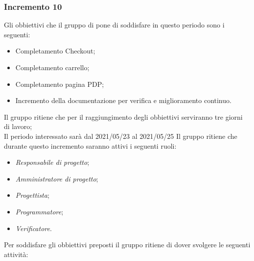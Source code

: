 \subsubsection{Incremento 10}
Gli obbiettivi che il gruppo di pone di soddisfare in questo periodo sono i seguenti:
\begin{itemize}
    \item Completamento Checkout;
    \item Completamento carrello;
    \item Completamento pagina PDP;
    \item Incremento della documentazione per verifica e miglioramento continuo.
\end{itemize}
Il gruppo ritiene che per il raggiungimento degli obbiettivi serviranno tre giorni di lavoro;\\
Il periodo interessato sarà dal 2021/05/23 al 2021/05/25
Il gruppo ritiene che durante questo incremento saranno attivi i seguenti ruoli:
\begin{itemize}
    \item \textit{Responsabile di progetto};
    \item \textit{Amministratore di progetto};
    \item \textit{Progettista};
    \item \textit{Programmatore};
    \item \textit{Verificatore}.
\end{itemize}
Per soddisfare gli obbiettivi preposti il gruppo ritiene di dover svolgere le seguenti attività:
